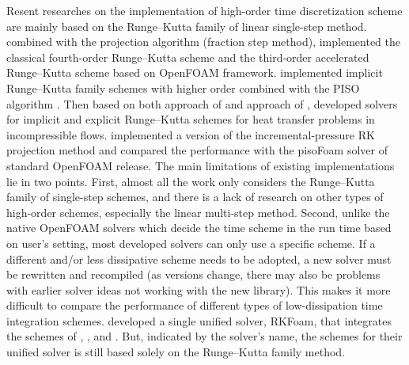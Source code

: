 \documentclass{article}
\begin{document}
Resent researches on the implementation of high-order time discretization scheme are mainly based on the Runge--Kutta family of linear single-step method. \citet{Vuorinen:2014} combined with the projection algorithm (fraction step method), implemented the classical fourth-order Runge--Kutta scheme and the third-order accelerated Runge--Kutta scheme based on OpenFOAM framework. \citet{Kazemi-Kamyab:2015} implemented implicit Runge--Kutta family schemes with higher order combined with the PISO algorithm \citep{Issa:1986:1}. Then based on both approach of \citet{Kazemi-Kamyab:2015} and approach of \citet{Sanderse:2012}, \citet{Alessandro:2018} developed solvers for implicit and explicit Runge--Kutta schemes for heat transfer problems in incompressible flows. \citep{Castaño:2019} implemented a version of the incremental-pressure RK projection method and compared the performance with the pisoFoam solver of standard OpenFOAM release. The main limitations of existing implementations lie in two points. First, almost all the work only considers the Runge--Kutta family of single-step schemes, and there is a lack of research on other types of high-order schemes, especially the linear multi-step method. Second, unlike the native OpenFOAM solvers which decide the time scheme in the run time based on user's setting, most developed solvers can only use a specific scheme. If a different and/or less dissipative scheme needs to be adopted, a new solver must be rewritten and recompiled (as versions change, there may also be problems with earlier solver ideas not working with the new library). This makes it more difficult to compare the performance of different types of low-dissipation time integration schemes. \citep{Komen:2020} developed a single unified solver, RKFoam, that integrates the schemes of \citet{Vuorinen:2014}, \citet{Kazemi-Kamyab:2015}, and \citet{Alessandro:2018}. But, indicated by the solver's name, the schemes for their unified solver is still based solely on the Runge--Kutta family method.
\end{document}
